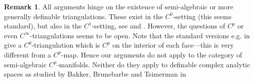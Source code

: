 \documentclass[11pt,a4paper]{amsart}
\theoremstyle{definition}
\newtheorem{rem}[lemma]{Remark}
\begin{document}
\begin{rem}All arguments hinge on the existence of semi-algebraic or more generally definable triangulations. These exist in the $C^0$-setting (this seems standard), but also in the $C^1$-setting, see \cite{ohmoto-shiota-triangulation} and \cite{omin-triang}. However, the questions of $C^p$ or even $C^\infty$-triangulations seems to be open. Note that the standard versions e.g. in \cite{D:oMin} give a $C^0$-triangulation which is $C^p$ on the interior of each face---this is very different from a $C^p$-map.
Hence our arguments do not apply to the category of  semi-algebraic $C^p$-manifolds. Neither do they apply to definable complex analytic spaces as studied by Bakker, Brunebarbe and Tsimerman in
\cite{omingaga} 
\end{rem}



\end{document}
